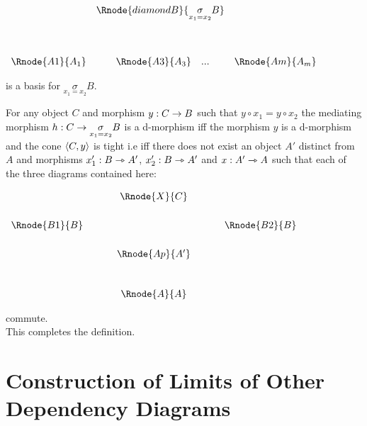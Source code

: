 \documentclass[10pt,a4paper]{scrartcl}
\begin{document}
\begin{enumerate} [(i)]
\begin{center}
\setlength{\arraycolsep}{.1cm}
$
\begin{array}{cp{.35cm}cp{.4cm}c}
                  & \multicolumn{3}{c}{\Rnode{diamondB}{\underset{x_1=x_2}{\sigma}B}}& \\ [1.4cm]
\Rnode{A1}{A_1} & &\Rnode{A3}{A_3} &... & \Rnode{Am}{A_m}\\
\end{array}
$
\end{center}
\setlength{\arraycolsep}{0.1cm}
\noindent is a basis for $\underset{x_1=x_2}{\sigma}B$. 

\noindent For any object $C$ and morphism $y: C \rightarrow B$ such that
$y \circ x_1 = y \circ x_2$
the mediating morphism $h: C \rightarrow \underset{x_1=x_2}{\sigma}B$ is a d-morphism iff 
the morphism $y$ is a d-morphism and the cone $\left\langle C,y\right\rangle$ is tight i.e iff there does not exist an object $A'$ distinct from 
$A$ and morphisms $x'_1: B \rightarrowtriangle A'$, $x'_2: B \rightarrowtriangle A'$ and $x:A' \rightarrowtriangle A$ such that each of the three diagrams contained here:

\begin{center}
$
\begin{array}{cp{0.5cm}cp{0.5cm}c}
               && \Rnode{X}{C}&&                  \\ [0.6cm]
\Rnode{B1}{B}&&                  && \Rnode{B2}{B} \\ [0.6cm]
               &&\Rnode{Ap}{A'}  &&               \\ [1cm]
               &&\Rnode{A}{A}    && 
\end{array}
$
\end{center}

\noindent commute. \\


\noindent This completes the definition.

\end{enumerate}

\section{Construction of Limits of Other Dependency Diagrams}
\end{document}
